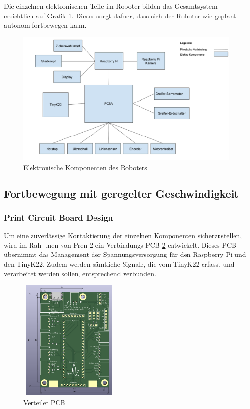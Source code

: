 Die einzelnen elektronischen Teile im Roboter bilden das Gesamtsystem ersichtlich auf Grafik \ref{fig:electro-components}. Dieses sorgt dafuer, dass sich der Roboter wie geplant autonom fortbewegen kann.

\begin{figure}[H]
\centering
\includegraphics[width=\textwidth]{assets/gesamtkonzept/electronics.png}
\caption{Elektronische Komponenten des Roboters}
\label{fig:electro-components}
\end{figure} 

\newpage

\subsection{Fortbewegung mit geregelter Geschwindigkeit}

\subsubsection{Print Circuit Board Design}
\label{pcb}

Um eine zuverlässige Kontaktierung der einzelnen Komponenten sicherzustellen, wird im Rah-
men von Pren 2 ein Verbindungs-PCB \ref{fig: Verteiler PCB} entwickelt. Dieses PCB übernimmt das Management der
Spannungsversorgung für den Raspberry Pi und den TinyK22. Zudem werden sämtliche Signale,
die vom TinyK22 erfasst und verarbeitet werden sollen, entsprechend verbunden.

\begin{figure}[H]
\centering
\includegraphics[width=5cm, height=6cm]{assets/ET/PCB/VerteilerPCB_unbestueckt.png}
\caption{Verteiler PCB}
\label{fig: Verteiler PCB}
\end{figure}

